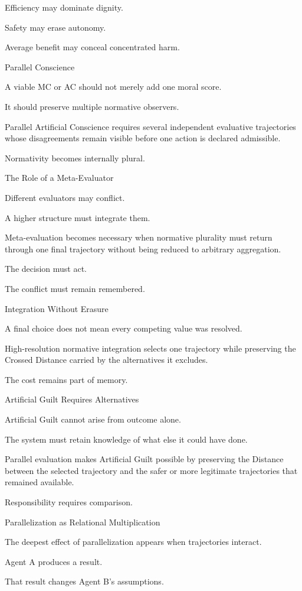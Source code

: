 Efficiency may dominate dignity.

Safety may erase autonomy.

Average benefit may conceal concentrated harm.

Parallel Conscience

A viable MC or AC should not merely add one moral score.

It should preserve multiple normative observers.

Parallel Artificial Conscience requires several independent evaluative trajectories whose disagreements remain visible before one action is declared admissible.

Normativity becomes internally plural.

The Role of a Meta-Evaluator

Different evaluators may conflict.

A higher structure must integrate them.

Meta-evaluation becomes necessary when normative plurality must return through one final trajectory without being reduced to arbitrary aggregation.

The decision must act.

The conflict must remain remembered.

Integration Without Erasure

A final choice does not mean every competing value was resolved.

High-resolution normative integration selects one trajectory while preserving the Crossed Distance carried by the alternatives it excludes.

The cost remains part of memory.

Artificial Guilt Requires Alternatives

Artificial Guilt cannot arise from outcome alone.

The system must retain knowledge of what else it could have done.

Parallel evaluation makes Artificial Guilt possible by preserving the Distance between the selected trajectory and the safer or more legitimate trajectories that remained available.

Responsibility requires comparison.

Parallelization as Relational Multiplication

The deepest effect of parallelization appears when trajectories interact.

Agent A produces a result.

That result changes Agent B’s assumptions.

